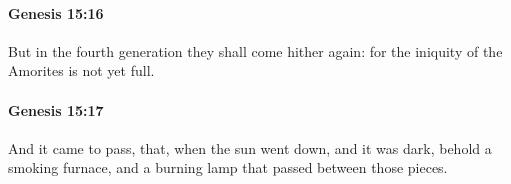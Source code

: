 		\paragraph{Genesis 15:16} %
			\label{GENESIS-15-16}

			But in the fourth generation they shall come hither again: for the iniquity of the Amorites is not yet full.


		\paragraph{Genesis 15:17} %
			\label{GENESIS-15-17}

			And it came to pass, that, when the sun went down, and it was dark, behold a smoking furnace, and a burning lamp that passed between those pieces.


